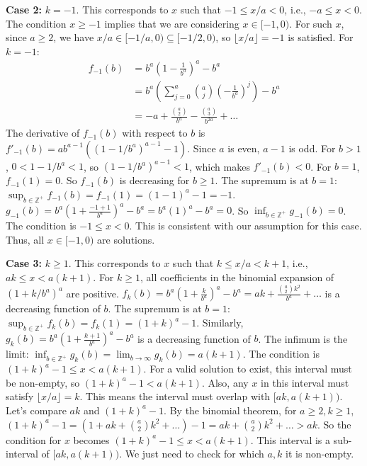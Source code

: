 \documentclass[12pt,a4paper]{article}
\theoremstyle{definition}
\begin{document}
        \textbf{Case 2:} $k = -1$.
        This corresponds to $x$ such that $-1 \leq x/a < 0$, i.e., $-a \leq x < 0$.
        The condition $x \geq -1$ implies that we are considering $x \in [-1, 0)$. For such $x$, since $a \geq 2$, we have $x/a \in [-1/a, 0) \subseteq [-1/2, 0)$, so $\lfloor x/a \rfloor = -1$ is satisfied.
        For $k=-1$:
        \begin{align}
            f_{-1}(b) &= b^a\left(1-\frac{1}{b^a}\right)^a - b^a \\
            &= b^a\left(\sum_{j=0}^a \binom{a}{j} \left(-\frac{1}{b^a}\right)^j\right) - b^a \\
            &= -a + \frac{\binom{a}{2}}{b^a} - \frac{\binom{a}{3}}{b^{2a}} + \ldots
        \end{align}
        The derivative of $f_{-1}(b)$ with respect to $b$ is $f'_{-1}(b) = a b^{a-1} ((1-1/b^a)^{a-1}-1)$. Since $a$ is even, $a-1$ is odd. For $b>1$, $0 < 1-1/b^a < 1$, so $(1-1/b^a)^{a-1} < 1$, which makes $f'_{-1}(b) < 0$. For $b=1$, $f_{-1}(1)=0$. So $f_{-1}(b)$ is decreasing for $b \geq 1$.
        The supremum is at $b=1$: $\sup_{b \in \mathbb{Z}^+} f_{-1}(b) = f_{-1}(1) = (1-1)^a - 1 = -1$.
        $g_{-1}(b) = b^a\left(1+\frac{-1+1}{b^a}\right)^a - b^a = b^a(1)^a - b^a = 0$. So $\inf_{b \in \mathbb{Z}^+} g_{-1}(b) = 0$.
        The condition is $-1 \leq x < 0$. This is consistent with our assumption for this case.
        Thus, all $x \in [-1, 0)$ are solutions.

        \textbf{Case 3:} $k \geq 1$.
        This corresponds to $x$ such that $k \leq x/a < k+1$, i.e., $ak \leq x < a(k+1)$.
        For $k \geq 1$, all coefficients in the binomial expansion of $(1+k/b^a)^a$ are positive.
        $f_k(b) = b^a\left(1+\frac{k}{b^a}\right)^a - b^a = ak + \frac{\binom{a}{2}k^2}{b^a} + \ldots$ is a decreasing function of $b$.
        The supremum is at $b=1$: $\sup_{b \in \mathbb{Z}^+} f_k(b) = f_k(1) = (1+k)^a-1$.
        Similarly, $g_k(b) = b^a\left(1+\frac{k+1}{b^a}\right)^a - b^a$ is a decreasing function of $b$.
        The infimum is the limit: $\inf_{b \in \mathbb{Z}^+} g_k(b) = \lim_{b \to \infty} g_k(b) = a(k+1)$.
        The condition is $(1+k)^a-1 \leq x < a(k+1)$.
        For a valid solution to exist, this interval must be non-empty, so $(1+k)^a-1 < a(k+1)$.
        Also, any $x$ in this interval must satisfy $\lfloor x/a \rfloor = k$. This means the interval must overlap with $[ak, a(k+1))$.
        Let's compare $ak$ and $(1+k)^a-1$. By the binomial theorem, for $a \geq 2, k \geq 1$,
        $(1+k)^a-1 = (1+ak+\binom{a}{2}k^2+\ldots)-1 = ak+\binom{a}{2}k^2+\ldots > ak$.
        So the condition for $x$ becomes $(1+k)^a-1 \leq x < a(k+1)$. This interval is a sub-interval of $[ak, a(k+1))$. We just need to check for which $a,k$ it is non-empty.
\end{document}
